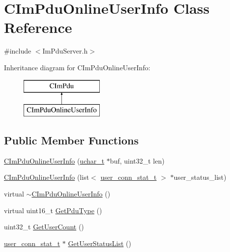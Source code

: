 \hypertarget{class_c_im_pdu_online_user_info}{}\section{C\+Im\+Pdu\+Online\+User\+Info Class Reference}
\label{class_c_im_pdu_online_user_info}


{\ttfamily \#include $<$Im\+Pdu\+Server.\+h$>$}

Inheritance diagram for C\+Im\+Pdu\+Online\+User\+Info\+:\begin{figure}[H]
\begin{center}
\leavevmode
\includegraphics[height=2.000000cm]{class_c_im_pdu_online_user_info}
\end{center}
\end{figure}
\subsection*{Public Member Functions}
\begin{DoxyCompactItemize}
\item 
\hyperlink{class_c_im_pdu_online_user_info_aff9b6a6ef9b5a607f173142174012eb1}{C\+Im\+Pdu\+Online\+User\+Info} (\hyperlink{base_2ostype_8h_a124ea0f8f4a23a0a286b5582137f0b8d}{uchar\+\_\+t} $\ast$buf, uint32\+\_\+t len)
\item 
\hyperlink{class_c_im_pdu_online_user_info_a7f2d887b2d3e0fecd34eaff57c880cc2}{C\+Im\+Pdu\+Online\+User\+Info} (list$<$ \hyperlink{structuser__conn__stat__t}{user\+\_\+conn\+\_\+stat\+\_\+t} $>$ $\ast$user\+\_\+status\+\_\+list)
\item 
virtual \hyperlink{class_c_im_pdu_online_user_info_aaf4eb06eabab5e2355c440b81525acbc}{$\sim$\+C\+Im\+Pdu\+Online\+User\+Info} ()
\item 
virtual uint16\+\_\+t \hyperlink{class_c_im_pdu_online_user_info_af22933dfaaa72028ba485ba56d58ab68}{Get\+Pdu\+Type} ()
\item 
uint32\+\_\+t \hyperlink{class_c_im_pdu_online_user_info_a6b025bc7655fcc56b469d598ba4f7ff0}{Get\+User\+Count} ()
\item 
\hyperlink{structuser__conn__stat__t}{user\+\_\+conn\+\_\+stat\+\_\+t} $\ast$ \hyperlink{class_c_im_pdu_online_user_info_af6e4477c1fdb9295f634654bbe3dd6e1}{Get\+User\+Status\+List} ()
\end{DoxyCompactItemize}
